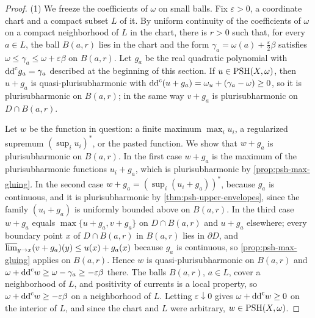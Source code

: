 \begin{proof}
(1) We freeze the coefficients of $\omega$ on small balls. Fix $\varepsilon>0$, a coordinate chart and a compact subset $L$ of it. By uniform continuity of the coefficients of $\omega$ on a compact neighborhood of $L$ in the chart, there is $r>0$ such that, for every $a\in L$, the ball $B(a,r)$ lies in the chart and the form $\gamma_a=\omega(a)+\tfrac\varepsilon2\beta$ satisfies $\omega\leq\gamma_a\leq\omega+\varepsilon\beta$ on $B(a,r)$. Let $g_a$ be the real quadratic polynomial with $\mathrm{dd}^{\mathrm{c}} g_a=\gamma_a$ described at the beginning of this section. If $u\in\mathrm{PSH}(X,\omega)$, then $u+g_a$ is quasi-plurisubharmonic with $\mathrm{dd}^{\mathrm{c}}(u+g_a)=\omega_u+(\gamma_a-\omega)\geq0$, so it is plurisubharmonic on $B(a,r)$; in the same way $v+g_a$ is plurisubharmonic on $D\cap B(a,r)$.

Let $w$ be the function in question: a finite maximum $\max_iu_i$, a regularized supremum $(\sup_iu_i)^*$, or the pasted function. We show that $w+g_a$ is plurisubharmonic on $B(a,r)$. In the first case $w+g_a$ is the maximum of the plurisubharmonic functions $u_i+g_a$, which is plurisubharmonic by \cref{prop:psh-max-gluing}. In the second case $w+g_a=(\sup_i(u_i+g_a))^*$, because $g_a$ is continuous, and it is plurisubharmonic by \cref{thm:psh-upper-envelopes}, since the family $(u_i+g_a)$ is uniformly bounded above on $B(a,r)$. In the third case $w+g_a$ equals $\max\{u+g_a,v+g_a\}$ on $D\cap B(a,r)$ and $u+g_a$ elsewhere; every boundary point $x$ of $D\cap B(a,r)$ in $B(a,r)$ lies in $\partial D$, and $\varlimsup_{y\to x}(v+g_a)(y)\leq u(x)+g_a(x)$ because $g_a$ is continuous, so \cref{prop:psh-max-gluing} applies on $B(a,r)$. Hence $w$ is quasi-plurisubharmonic on $B(a,r)$ and $\omega+\mathrm{dd}^{\mathrm{c}} w\geq\omega-\gamma_a\geq-\varepsilon\beta$ there. The balls $B(a,r)$, $a\in L$, cover a neighborhood of $L$, and positivity of currents is a local property, so $\omega+\mathrm{dd}^{\mathrm{c}} w\geq-\varepsilon\beta$ on a neighborhood of $L$. Letting $\varepsilon\downarrow0$ gives $\omega+\mathrm{dd}^{\mathrm{c}} w\geq0$ on the interior of $L$, and since the chart and $L$ were arbitrary, $w\in\mathrm{PSH}(X,\omega)$.


\end{proof}
